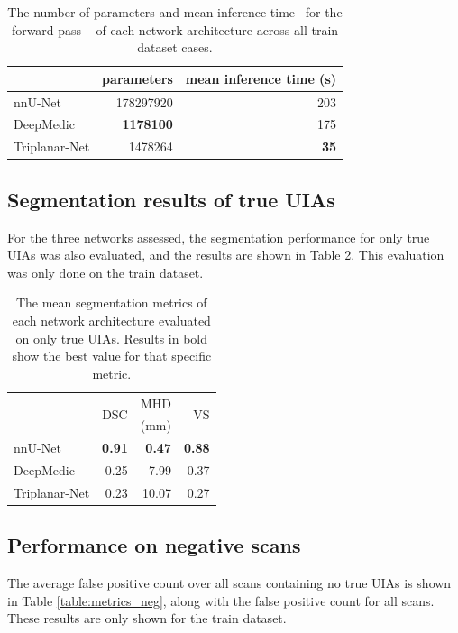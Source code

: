 \begin{table}[h!tp]
	\centering
	\begin{tabular}{l r r }
		& parameters & mean inference time (s) \\
		\hline
		nnU-Net & 178297920 & 203 \\
		DeepMedic & \textbf{1178100} & 175 \\
		Triplanar-Net & 1478264 & \textbf{35} \\
	\end{tabular}
	\caption[Number of parameters and inference time.]{The number of parameters and mean inference time --for the forward pass -- of each network architecture across all train dataset cases.}
	\label{table:inference}
\end{table}

\subsection{Segmentation results of true UIAs}
For the three networks assessed, the segmentation performance for only true UIAs  was also evaluated, and the results are shown in Table \ref{table:metrics_pos}. This evaluation was only done on the train dataset.

\begin{table}[h]
	\centering
	\begin{tabular}{ l  r r r }
%		
		& \multirow{2}{2em}{DSC} & MHD & \multirow{2}{2em}{VS} \\
		& & (mm) & \\
		\hline
		nnU-Net & \textbf{0.91} & \textbf{0.47} & \textbf{0.88} \\
		DeepMedic & 0.25 & 7.99 & 0.37 \\
		Triplanar-Net & 0.23 & 10.07 & 0.27 \\
	\end{tabular}
	\caption[Segmentation results of true UIAs.]{The mean segmentation metrics of each network architecture evaluated on only true UIAs. Results in bold show the best value for that specific metric.}
	\label{table:metrics_pos}
\end{table}

\subsection{Performance on negative scans}
The average false positive count over all scans containing no true UIAs is shown in Table \ref{table:metrics_neg}, along with the false positive count for all scans. These results are only shown for the train dataset.

